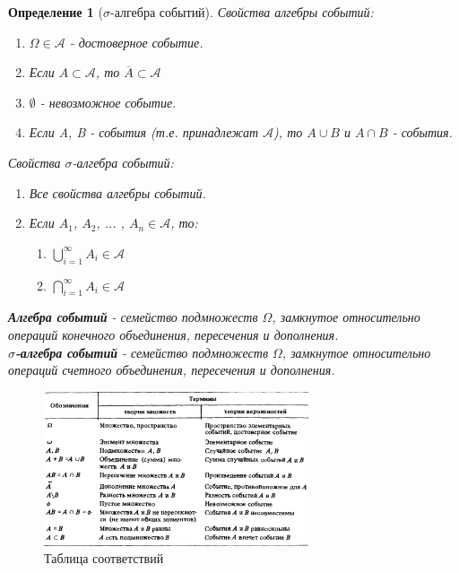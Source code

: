 \documentclass[14pt]{extarticle}
\theoremstyle{breakstyle}
\newtheorem{definition}{Определение}[subsection]
\begin{document}
\begin{definition}[$\sigma$-алгебра событий]

Свойства алгебры событий:
\begin{enumerate}[noitemsep, topsep=0pt]
    \item $\Omega \in \mathscr{A}$ - достоверное событие.
    \item Если $A \subset \mathscr{A}$, то $\overline{A} \subset \mathscr{A}$
    \item $\emptyset$ - невозможное событие.
    \item Если A, B - события (т.е. принадлежат $\mathscr{A}$), то $A \cup B$ и $A \cap B$ - события. 
\end{enumerate}

\vspace{1em}
Свойства $\sigma$-алгебра событий:
\begin{enumerate}[noitemsep, topsep=0pt]
    \item Все свойства алгебры событий.
    \item Если $A_1$, $A_2$, ... , $A_n \in \mathscr{A}$, то:
    \begin{enumerate}
        \item $\bigcup_{i=1}^{\infty} A_i \in \mathscr{A}$
        \item $\bigcap_{i=1}^{\infty} A_i \in \mathscr{A}$
    \end{enumerate}
\end{enumerate}

\vspace{1em}
\textbf{Алгебра событий} - семейство подмножеств $\Omega$, замкнутое относительно операций конечного объединения, пересечения и дополнения. \\
\textbf{$\sigma$-алгебра событий} - семейство подмножеств $\Omega$, замкнутое относительно операций счетного объединения, пересечения и дополнения.

\end{definition}

\begin{figure}[H]
    \centering
    \includegraphics[width=0.7\textwidth]{images/table.png}
    \caption{Таблица соответствий}
    \label{fig:prob-table}
\end{figure}
\end{document}
